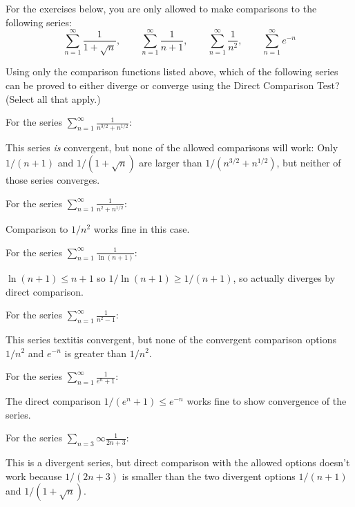 \documentclass{ximera}
\begin{document}
For the exercises below, you are only allowed to make comparisons to the following series:
\[ \sum_{n=1}^\infty \frac{1}{1+\sqrt{n}}, \qquad \sum_{n=1}^\infty \frac{1}{n+1},  \qquad \sum_{n=1}^\infty \frac{1}{n^2}, \qquad \sum_{n=1}^\infty e^{-n} \]
\begin{exercise}
Using only the comparison functions listed above, which of the following series can be proved to either diverge or converge using the Direct Comparison Test? (Select all that apply.)
\begin{selectAll}
\end{selectAll}
\begin{feedback}
For the series {$\displaystyle \sum_{n=1}^\infty \frac{1}{n^{3/2}+n^{1/2}}$}:
\begin{expandable}
This series \textit{is} convergent, but none of the allowed comparisons will work: Only $1/(n+1)$ and $1/(1+\sqrt{n})$ are larger than $1/(n^{3/2}+n^{1/2})$, but neither of those series converges.
\end{expandable}

For the series {$\displaystyle \sum_{n=1}^\infty \frac{1}{n^2 + n^{1/2}}$}:
\begin{expandable}
Comparison to $1/n^2$ works fine in this case.
\end{expandable}

For the series {$\displaystyle \sum_{n=1}^\infty \frac{1}{\ln (n+1)}$}:
\begin{expandable}
$\ln (n+1) \leq n+1$ so $1/\ln (n+1) \geq 1/(n+1)$, so actually diverges by direct comparison.
\end{expandable}

For the series {$\displaystyle \sum_{n=1}^\infty \frac{1}{n^2-1}$}:
\begin{expandable}
This series textit{is} convergent, but none of the convergent comparison options $1/n^2$ and $e^{-n}$ is greater than $1/n^2$.
\end{expandable}

For the series {$\displaystyle \sum_{n=1}^\infty \frac{1}{e^n  + 1}$}:
\begin{expandable}
The direct comparison $1/(e^n + 1) \leq e^{-n}$ works fine to show convergence of the series.
\end{expandable}

For the series {$\displaystyle \sum_{n=3}{\infty} \frac{1}{2n+3}$}:
\begin{expandable}
This is a divergent series, but direct comparison with the allowed options doesn't work because $1/(2n+3)$ is smaller than the two divergent options $1/(n+1)$ and $1/(1+\sqrt{n})$.
\end{expandable}
\end{feedback}
\end{exercise}
\end{document}
